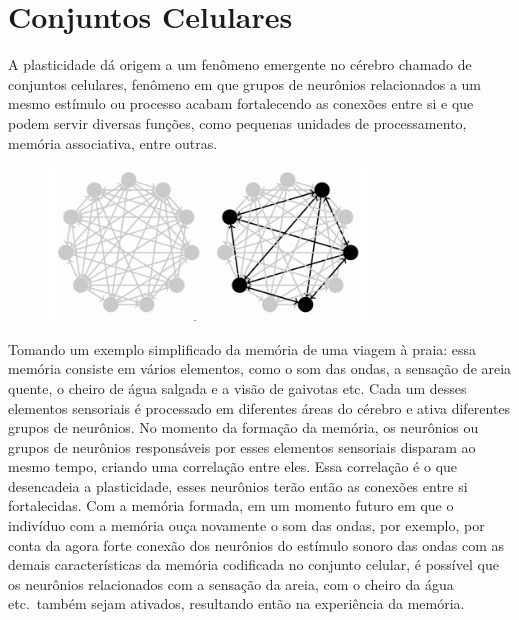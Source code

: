 \section{Conjuntos Celulares}

A plasticidade dá origem a um fenômeno emergente no cérebro chamado de conjuntos celulares, fenômeno em que grupos de neurônios
relacionados a um mesmo estímulo ou processo acabam fortalecendo as conexões entre si e que podem servir diversas funções, como
pequenas unidades de processamento, memória associativa, entre outras.

\begin{figure}[!ht]
\centering
{}
\includegraphics[width=8.5cm]{figuras/Conjunto celular.png}
\end{figure}

Tomando um exemplo simplificado da memória de uma viagem à praia: essa memória consiste em vários elementos, como o som das ondas,
a sensação de areia quente, o cheiro de água salgada e a visão de gaivotas etc. Cada um desses elementos sensoriais é processado
em diferentes áreas do cérebro e ativa diferentes grupos  de neurônios. No momento da formação da memória, os neurônios ou grupos
de neurônios responsáveis por esses elementos sensoriais disparam ao mesmo tempo, criando uma correlação entre eles. Essa
correlação é o que desencadeia a plasticidade, esses neurônios terão então as conexões entre si fortalecidas. Com a memória
formada, em um momento futuro em que o indivíduo com a memória ouça novamente o som das ondas, por exemplo, por conta da agora
forte conexão dos neurônios do estímulo sonoro das ondas com as demais características da memória codificada no conjunto celular,
é possível que os neurônios relacionados com a sensação da areia, com o cheiro da água etc.\ também sejam ativados, resultando
então na experiência da memória.

